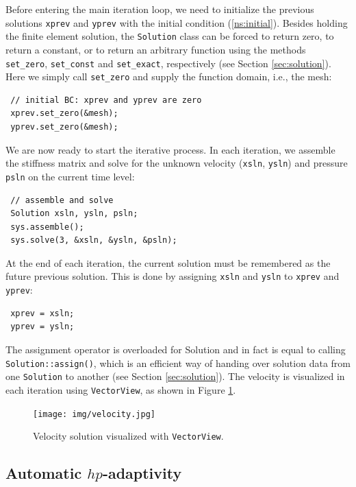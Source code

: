 Before entering the main iteration loop, we need to initialize the previous solutions
{\tt xprev} and {\tt yprev} with the initial condition 
(\ref{ns:initial}). Besides holding the finite element solution, the {\tt Solution} class
can be forced to return zero, to return a constant, or to return an arbitrary function
using the methods \verb"set_zero", \verb"set_const" and \verb"set_exact", respectively
(see Section \ref{sec:solution}). Here we simply call \verb"set_zero" and supply the
function domain, i.e., the mesh:
\begin{lstlisting}
 // initial BC: xprev and yprev are zero
 xprev.set_zero(&mesh);
 yprev.set_zero(&mesh);
\end{lstlisting}

We are now ready to start the iterative process. In each iteration, we assemble the
stiffness matrix and solve for the unknown velocity ({\tt xsln}, {\tt ysln}) and
pressure {\tt psln} on the current time level:
\begin{lstlisting}
 // assemble and solve
 Solution xsln, ysln, psln;
 sys.assemble();
 sys.solve(3, &xsln, &ysln, &psln);
\end{lstlisting}

At the end of each iteration, the current solution must be remembered as the future
previous solution. This is done by assigning {\tt xsln} and {\tt ysln} to {\tt xprev}
and {\tt yprev}:
\begin{lstlisting}
 xprev = xsln;
 yprev = ysln;
\end{lstlisting}
The assignment operator is overloaded for Solution and in fact is equal to calling
{\tt Solution::assign()}, which is an efficient way of handing over solution data from
one {\tt Solution} to another (see Section \ref{sec:solution}).
The velocity is visualized in each iteration using {\tt VectorView}, as shown
in Figure \ref{fig:velocity}.

\begin{figure}[ht]
  \medskip \centering
  \texttt{[image: img/velocity.jpg]}
  \caption{Velocity solution visualized with {\tt VectorView}.}
  \label{fig:velocity}
\end{figure}



\subsection{Automatic $hp$-adaptivity}

